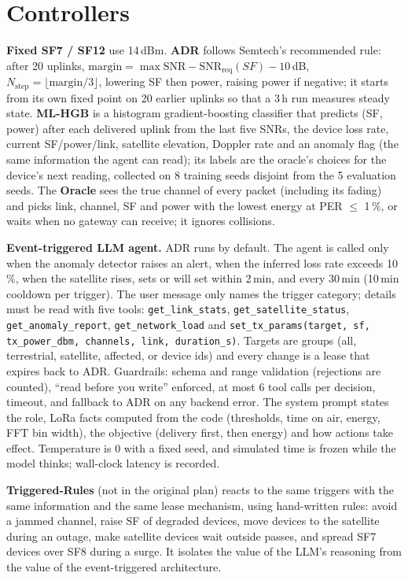 \section{Controllers}
\label{sec:method}

\textbf{Fixed SF7 / SF12} use 14\,dBm. \textbf{ADR} follows Semtech's recommended rule:
after 20 uplinks, $\text{margin}=\max\text{SNR}-\text{SNR}_\text{req}(SF)-10$\,dB,
$N_\text{step}=\lfloor\text{margin}/3\rfloor$, lowering SF then power, raising power if negative;
it starts from its own fixed point on 20 earlier uplinks so that a 3\,h run measures steady state.
\textbf{ML-HGB} is a histogram gradient-boosting classifier that predicts (SF, power) after each
delivered uplink from the last five SNRs, the device loss rate, current SF/power/link, satellite
elevation, Doppler rate and an anomaly flag (the same information the agent can read); its labels
are the oracle's choices for the device's next reading, collected on 8 training seeds disjoint from
the 5 evaluation seeds. The \textbf{Oracle} sees the true channel of every packet (including its
fading) and picks link, channel, SF and power with the lowest energy at PER $\le$ 1\,\%, or waits
when no gateway can receive; it ignores collisions.

\textbf{Event-triggered LLM agent.} ADR runs by default. The agent is called only when the
anomaly detector raises an alert, when the inferred loss rate exceeds 10\,\%, when the satellite
rises, sets or will set within 2\,min, and every 30\,min (10\,min cooldown per trigger). The user
message only names the trigger category; details must be read with five tools:
\texttt{get\_link\_stats}, \texttt{get\_satellite\_status}, \texttt{get\_anomaly\_report},
\texttt{get\_network\_load} and \texttt{set\_tx\_params(target, sf, tx\_power\_dbm, channels, link,
duration\_s)}. Targets are groups (all, terrestrial, satellite, affected, or device ids) and every
change is a lease that expires back to ADR. Guardrails: schema and range validation (rejections are
counted), ``read before you write'' enforced, at most 6 tool calls per decision, timeout, and fallback
to ADR on any backend error. The system prompt states the role, LoRa facts computed from the code
(thresholds, time on air, energy, FFT bin width), the objective (delivery first, then energy) and
how actions take effect. Temperature is 0 with a fixed seed, and simulated time is frozen while the
model thinks; wall-clock latency is recorded.

\textbf{Triggered-Rules} (not in the original plan) reacts to the same triggers with the same
information and the same lease mechanism, using hand-written rules: avoid a jammed channel, raise
SF of degraded devices, move devices to the satellite during an outage, make satellite devices wait
outside passes, and spread SF7 devices over SF8 during a surge. It isolates the value of the LLM's
reasoning from the value of the event-triggered architecture.

